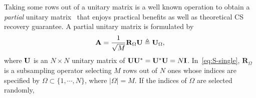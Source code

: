 \documentclass[journal]{IEEEtran}
\newcommand{\mO}{\mathcal{O}}
\newcommand{\abu}{{\bf a}}
\newcommand{\Abu}{{\bf A}}
\newcommand{\Ibu}{{\bf I}}
\newcommand{\Rbu}{{\bf R}}
\newcommand{\Ubu}{{\bf U}}
\newcommand{\Psibu}{{\bf \Psi}}
\numberwithin{const2}{const}
\begin{document}
Taking some rows out of a unitary matrix
is a well known operation to obtain a \emph{partial} unitary matrix~\cite{Duarte:struct} %
that %
enjoys practical benefits as well as theoretical CS recovery guarantee.
A partial unitary matrix is formulated by
\begin{equation}\label{eq:S-single}
	\Abu  =\frac{1}{\sqrt{M}} \mathbf{R}_{\Omega}\Ubu \triangleq \Ubu_\Omega,
\end{equation}
where $\Ubu$ is an $N \times N$ unitary matrix of $\Ubu \Ubu^* = \Ubu^* \Ubu = N \Ibu$.
In~\eqref{eq:S-single}, $\mathbf{R}_\Omega$ is a subsampling operator selecting 
$M$ rows out of $N$ ones whose indices are specified by $\Omega \subset \{1, \cdots, N\}$, where $|\Omega| = M$. 
If the indices of $\Omega$ are selected randomly, %
\end{document}
